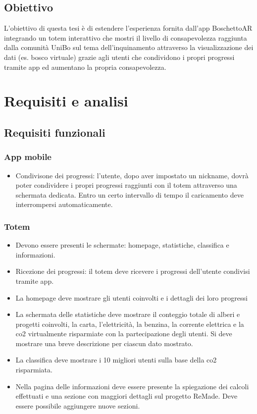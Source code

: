 \subsection{Obiettivo}
L'obiettivo di questa tesi è di estendere l'esperienza fornita dall'app BoschettoAR integrando un totem interattivo che mostri il livello di consapevolezza raggiunta dalla comunità UniBo sul tema dell'inquinamento attraverso la visualizzazione dei dati (es. bosco virtuale) grazie agli utenti che condividono i propri progressi tramite app ed aumentano la propria consapevolezza.

\section{Requisiti e analisi}
\subsection{Requisiti funzionali}
\subsubsection{App mobile}
\begin{itemize}
    \item Condivisone dei progressi: l'utente, dopo aver impostato un nickname, dovrà poter condividere i propri progressi raggiunti con il totem attraverso una schermata dedicata. Entro un certo intervallo di tempo il caricamento deve interrompersi automaticamente.
\end{itemize}
\subsubsection{Totem}
\begin{itemize}
    \item Devono essere presenti le schermate: homepage, statistiche, classifica e informazioni.
    \item Ricezione dei progressi: il totem deve ricevere i progressi dell'utente condivisi tramite app.
    \item La homepage deve mostrare gli utenti coinvolti e i dettagli dei loro progressi 
    \item La schermata delle statistiche deve mostrare il conteggio totale di alberi e progetti coinvolti, la carta, l'elettricità, la benzina, la corrente elettrica e la co2 virtualmente risparmiate con la partecipazione degli utenti. Si deve mostrare una breve descrizione per ciascun dato mostrato.
    \item La classifica deve mostrare i 10 migliori utenti sulla base della co2 risparmiata.
    \item Nella pagina delle informazioni deve essere presente la spiegazione dei calcoli effettuati e una sezione con maggiori dettagli sul progetto ReMade. Deve essere possibile aggiungere nuove sezioni.
\end{itemize}
